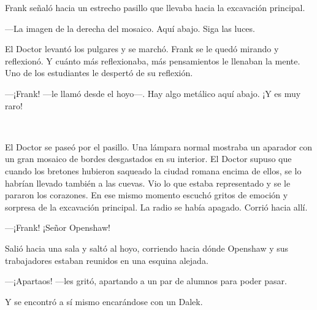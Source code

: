 Frank señaló hacia un estrecho pasillo que llevaba hacia la excavación
principal.

---La imagen de la derecha del mosaico. Aquí abajo. Siga las luces.

El Doctor levantó los pulgares y se marchó. Frank se le quedó mirando y
reflexionó. Y cuánto más reflexionaba, más pensamientos le llenaban la
mente. Uno de los estudiantes le despertó de su reflexión.

---¡Frank! ---le llamó desde el hoyo---. Hay algo metálico aquí abajo. ¡Y
es muy raro!

~

El Doctor se paseó por el pasillo. Una lámpara normal mostraba un
aparador con un gran mosaico de bordes desgastados en su interior. El
Doctor supuso que cuando los bretones hubieron saqueado la ciudad romana
encima de ellos, se lo habrían llevado también a las cuevas. Vio lo que
estaba representado y se le pararon los corazones. En ese mismo momento
escuchó gritos de emoción y sorpresa de la excavación principal. La
radio se había apagado. Corrió hacia allí.

---¡Frank! ¡Señor Openshaw!

Salió hacia una sala y saltó al hoyo, corriendo hacia dónde Openshaw y
sus trabajadores estaban reunidos en una esquina alejada.

---¡Apartaos! ---les gritó, apartando a un par de alumnos para poder
pasar.

Y se encontró a sí mismo encarándose con un Dalek.